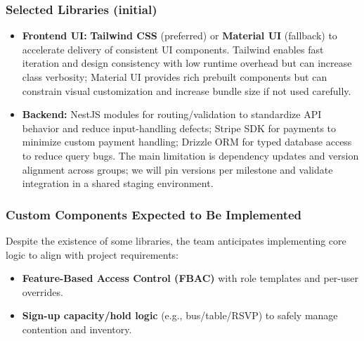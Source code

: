 \documentclass{article}
\begin{document}
\subsubsection*{Selected Libraries (initial)}
\begin{itemize}
  \item \textbf{Frontend UI:} \textbf{Tailwind CSS} (preferred) or \textbf{Material UI} (fallback) to accelerate delivery of consistent UI components. Tailwind enables fast iteration and design consistency with low runtime overhead but can increase class verbosity; Material UI provides rich prebuilt components but can constrain visual customization and increase bundle size if not used carefully.
  \item \textbf{Backend:} NestJS modules for routing/validation to standardize API behavior and reduce input-handling defects; Stripe SDK for payments to minimize custom payment handling; Drizzle ORM for typed database access to reduce query bugs. The main limitation is dependency updates and version alignment across groups; we will pin versions per milestone and validate integration in a shared staging environment.
\end{itemize}

\subsubsection*{Custom Components Expected to Be Implemented} 
Despite the existence of some libraries, the team anticipates implementing core logic to align with project requirements:
\begin{itemize}
  \item \textbf{Feature-Based Access Control (FBAC)} with role templates and per-user overrides.
  \item \textbf{Sign-up capacity/hold logic} (e.g., bus/table/RSVP) to safely manage contention and inventory.
\end{itemize}
\end{document}
